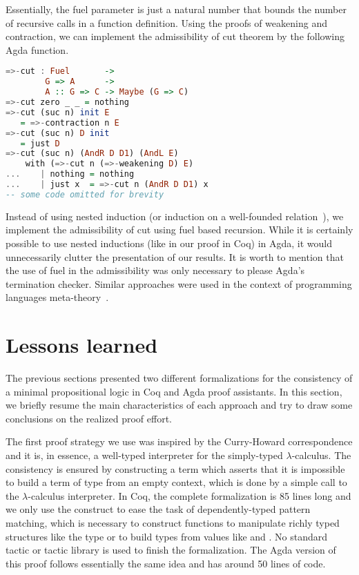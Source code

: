 Essentially, the fuel parameter is just a natural number that bounds the number of recursive calls in a function definition.
Using the proofs of weakening and contraction, we can implement
the admissibility of cut theorem by the following Agda function.



\begin{lstlisting}[language=haskell]
=>-cut : Fuel       ->
        G => A      ->
        A :: G => C -> Maybe (G => C)
=>-cut zero _ _ = nothing
=>-cut (suc n) init E
   = =>-contraction n E
=>-cut (suc n) D init
   = just D
=>-cut (suc n) (AndR D D1) (AndL E)
    with (=>-cut n (=>-weakening D) E)
...    | nothing = nothing
...    | just x  = =>-cut n (AndR D D1) x
-- some code omitted for brevity
\end{lstlisting}



Instead of using nested induction (or induction on a well-founded relation~\cite{Bertot04}), we implement the
admissibility of cut using fuel based recursion. While it is certainly possible to use nested inductions
(like in our proof in Coq) in Agda, it would unnecessarily clutter the presentation of our results. It is worth to
mention that the use of fuel in the admissibility was only necessary to please Agda's termination checker. Similar
approaches were used in the context of programming languages meta-theory~\cite{Amin17}.


\section{Lessons learned}\label{sec:lessons}


The previous sections presented two different formalizations for the consistency of a minimal
propositional logic in Coq and Agda proof assistants. In this section, we briefly resume the
main characteristics of each approach and try to draw some conclusions on the
realized proof effort.


The first proof strategy we use was inspired by the Curry-Howard correspondence and it is,
in essence, a well-typed interpreter for the
simply-typed $\lambda$-calculus. The consistency is ensured by constructing a term
which asserts that it is impossible to build a term of type  from an empty
context, which is done by a simple call to the $\lambda$-calculus interpreter.
In Coq, the complete formalization is 85 lines long and we only use the  construct
to ease the task of dependently-typed pattern matching, which is necessary
to construct functions to manipulate richly typed structures like the type  or to
build types from values like  and . No standard tactic or
tactic library is used to finish the formalization. The Agda version of this proof
follows essentially the same idea and has around 50 lines of code.


